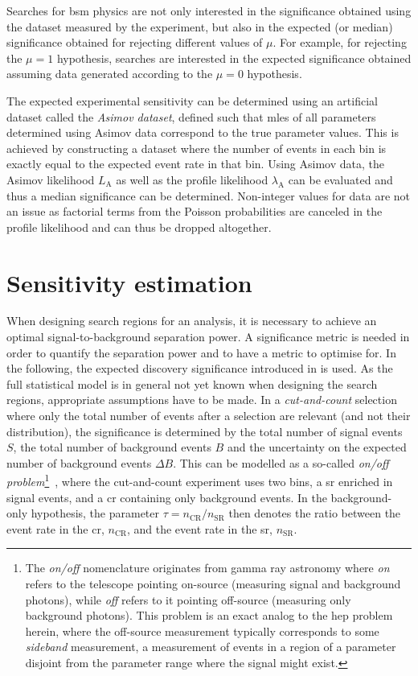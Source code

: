 Searches for \gls{bsm} physics are not only interested in the significance obtained using the dataset measured by the experiment, but also in the expected (or median) significance obtained for rejecting different values of $\mu$.
For example, for rejecting the $\mu = 1$ hypothesis, searches are interested in the expected significance obtained assuming data generated according to the $\mu = 0$ hypothesis.

The expected experimental sensitivity can be determined using an artificial dataset called the \textit{Asimov dataset}, defined such that \glspl{mle} of all parameters determined using Asimov data correspond to the true parameter values.
This is achieved by constructing a dataset where the number of events in each bin is exactly equal to the expected event rate in that bin. Using Asimov data, the Asimov likelihood $L_\mathrm{A}$ as well as the profile likelihood $\lambda_\mathrm{A}$ can be evaluated and thus a median significance can be determined.
Non-integer values for data are not an issue as factorial terms from the Poisson probabilities are canceled in the profile likelihood and can thus be dropped altogether. 

\section{Sensitivity estimation}\label{sec:sensitivity_estimation}

When designing search regions for an analysis, it is necessary to achieve an optimal signal-to-background separation power.
A significance metric is needed in order to quantify the separation power and to have a metric to optimise for.
In the following, the expected discovery significance introduced in \cite{Cousins:2007bmb} is used. As the full statistical model is in general not yet known when designing the search regions, appropriate assumptions have to be made. In a \textit{cut-and-count} selection where only the total number of events after a selection are relevant (and not \eg their distribution), the significance is determined by the total number of signal events $S$, the total number of background events $B$ and the uncertainty on the expected number of background events $\Delta B$.
This can be modelled as a so-called \textit{on/off problem}\footnote{The \textit{on/off} nomenclature originates from gamma ray astronomy where \textit{on} refers to the telescope pointing on-source (measuring signal and background photons), while \textit{off} refers to it pointing off-source (measuring only background photons). This problem is an exact analog to the \gls{hep} problem herein, where the off-source measurement typically corresponds to some \textit{sideband} measurement, \ie a measurement of events in a region of a parameter disjoint from the parameter range where the signal might exist.}~\cite{Cousins:2007bmb, CRANMER_2006}, where the cut-and-count experiment uses two bins, a \gls{sr} enriched in signal events, and a \gls{cr} containing only background events.
In the background-only hypothesis, the parameter $\tau = n_\mathrm{CR} / n_\mathrm{SR}$ then denotes the ratio between the event rate in the \gls{cr}, $n_\mathrm{CR}$, and the event rate in the \gls{sr}, $n_\mathrm{SR}$.

